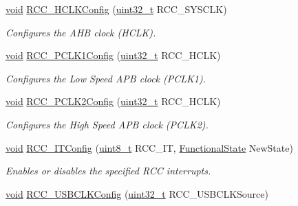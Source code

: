 \begin{DoxyCompactItemize}
\hyperlink{usb__devapi_8h_afabf60e7f57651d6d595a02c75f07cd0}{void} \hyperlink{group___r_c_c___private___functions_ga9d0aec72e236c6cdf3a3a82dfb525491}{R\+C\+C\+\_\+\+H\+C\+L\+K\+Config} (\hyperlink{_p_e___types_8h_a33594304e786b158f3fb30289278f5af}{uint32\+\_\+t} R\+C\+C\+\_\+\+S\+Y\+S\+C\+LK)
\begin{DoxyCompactList}\small\item\em Configures the A\+HB clock (H\+C\+LK). \end{DoxyCompactList}\item 
\hyperlink{usb__devapi_8h_afabf60e7f57651d6d595a02c75f07cd0}{void} \hyperlink{group___r_c_c___private___functions_ga448137346d4292985d4e7a61dd1a824f}{R\+C\+C\+\_\+\+P\+C\+L\+K1\+Config} (\hyperlink{_p_e___types_8h_a33594304e786b158f3fb30289278f5af}{uint32\+\_\+t} R\+C\+C\+\_\+\+H\+C\+LK)
\begin{DoxyCompactList}\small\item\em Configures the Low Speed A\+PB clock (P\+C\+L\+K1). \end{DoxyCompactList}\item 
\hyperlink{usb__devapi_8h_afabf60e7f57651d6d595a02c75f07cd0}{void} \hyperlink{group___r_c_c___private___functions_ga09f9c010a4adca9e036da42c2ca6126a}{R\+C\+C\+\_\+\+P\+C\+L\+K2\+Config} (\hyperlink{_p_e___types_8h_a33594304e786b158f3fb30289278f5af}{uint32\+\_\+t} R\+C\+C\+\_\+\+H\+C\+LK)
\begin{DoxyCompactList}\small\item\em Configures the High Speed A\+PB clock (P\+C\+L\+K2). \end{DoxyCompactList}\item 
\hyperlink{usb__devapi_8h_afabf60e7f57651d6d595a02c75f07cd0}{void} \hyperlink{group___r_c_c___private___functions_gaa953aa226e9ce45300d535941e4dfe2f}{R\+C\+C\+\_\+\+I\+T\+Config} (\hyperlink{_p_e___types_8h_aba7bc1797add20fe3efdf37ced1182c5}{uint8\+\_\+t} R\+C\+C\+\_\+\+IT, \hyperlink{agilefox_2library_2inc_2stm32f10x__type_8h_ac9a7e9a35d2513ec15c3b537aaa4fba1}{Functional\+State} New\+State)
\begin{DoxyCompactList}\small\item\em Enables or disables the specified R\+CC interrupts. \end{DoxyCompactList}\item 
\hyperlink{usb__devapi_8h_afabf60e7f57651d6d595a02c75f07cd0}{void} \hyperlink{group___r_c_c___private___functions_ga895b3ff3d143c990f1cd0146aa260081}{R\+C\+C\+\_\+\+U\+S\+B\+C\+L\+K\+Config} (\hyperlink{_p_e___types_8h_a33594304e786b158f3fb30289278f5af}{uint32\+\_\+t} R\+C\+C\+\_\+\+U\+S\+B\+C\+L\+K\+Source)

\end{DoxyCompactItemize}
